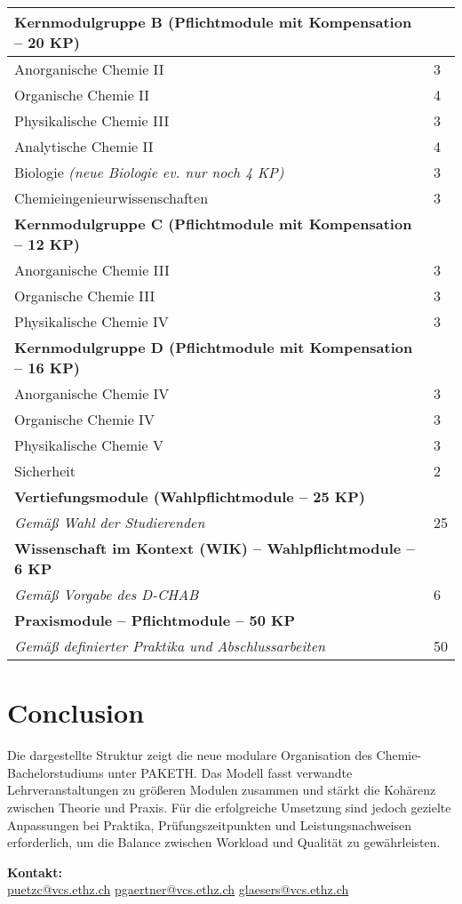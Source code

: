 \documentclass[a4paper]{article}
\begin{document}
\begin{longtable}{|p{}|p{}|}
\textbf{Kernmodulgruppe B (Pflichtmodule mit Kompensation – 20 KP)} & \\ \hline
Anorganische Chemie II & 3 \\ \hline
Organische Chemie II & 4 \\ \hline
Physikalische Chemie III & 3 \\ \hline
Analytische Chemie II & 4 \\ \hline
Biologie \textit{(neue Biologie ev. nur noch 4 KP)} & 3 \\ \hline
Chemieingenieurwissenschaften & 3 \\ \hline

\textbf{Kernmodulgruppe C (Pflichtmodule mit Kompensation – 12 KP)} & \\ \hline
Anorganische Chemie III & 3 \\ \hline
Organische Chemie III & 3 \\ \hline
Physikalische Chemie IV & 3 \\ \hline

\textbf{Kernmodulgruppe D (Pflichtmodule mit Kompensation – 16 KP)} & \\ \hline
Anorganische Chemie IV & 3 \\ \hline
Organische Chemie IV & 3 \\ \hline
Physikalische Chemie V & 3 \\ \hline
Sicherheit & 2 \\ \hline

\textbf{Vertiefungsmodule (Wahlpflichtmodule – 25 KP)} & \\ \hline
\textit{Gemäß Wahl der Studierenden} & 25 \\ \hline

\textbf{Wissenschaft im Kontext (WIK) – Wahlpflichtmodule – 6 KP} & \\ \hline
\textit{Gemäß Vorgabe des D-CHAB} & 6 \\ \hline

\textbf{Praxismodule – Pflichtmodule – 50 KP} & \\ \hline
\textit{Gemäß definierter Praktika und Abschlussarbeiten} & 50 \\ \hline
\end{longtable}

\section{Conclusion}

Die dargestellte Struktur zeigt die neue modulare Organisation des Chemie-Bachelorstudiums unter PAKETH.  
Das Modell fasst verwandte Lehrveranstaltungen zu größeren Modulen zusammen und stärkt die Kohärenz zwischen Theorie und Praxis.  
Für die erfolgreiche Umsetzung sind jedoch gezielte Anpassungen bei Praktika, Prüfungszeitpunkten und Leistungsnachweisen erforderlich, um die Balance zwischen Workload und Qualität zu gewährleisten.

\vfill
\noindent\textbf{Kontakt:}\\
\href{mailto:puetzc@vcs.ethz.ch}{puetzc@vcs.ethz.ch} \quad
\href{mailto:pgaertner@vcs.ethz.ch}{pgaertner@vcs.ethz.ch} \quad
\href{mailto:glaesers@vcs.ethz.ch}{glaesers@vcs.ethz.ch}
\end{document}
